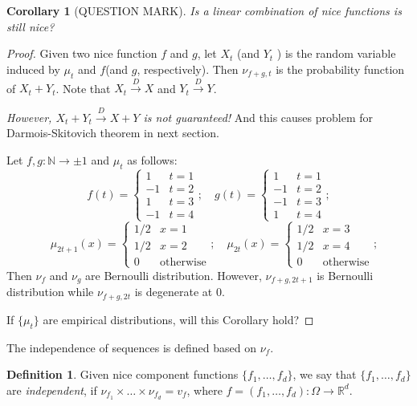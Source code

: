 \documentclass[english]{article} %
\newcommand{\real}{\mathbb{R}}
\renewcommand{\natural}{\mathbb{N}}
\providecommand{\definitionname}{Definition}
\providecommand{\corollaryname}{Corollary}
\theoremstyle{plain}
\newtheorem{cor}[thm]{\protect\corollaryname}
\theoremstyle{definition}
\newtheorem{definition}{\protect\definitionname}
\theoremstyle{remark}
\begin{document}
\begin{cor}[QUESTION MARK]
Is a linear combination of nice functions is still nice?
\end{cor}
\begin{proof}
Given two nice function $f$ and $g$, let $X_t$ (and $Y_t$ ) is the random variable induced by $\mu_t$ and $f$(and $g$, respectively). Then $\nu_{f+g,t}$ is the probability function of $X_t+Y_t$. Note that $X_t \xrightarrow{D} X$ and  $Y_t \xrightarrow{D} Y$. 

\emph{However, $X_t+Y_t \xrightarrow{D} X+Y$ is not guaranteed!} And this causes problem for Darmois-Skitovich theorem in next section.

Let $f,g:\natural \rightarrow {\pm1}$ and $\mu_t$ as follows:
\[
f(t) = \begin{cases} 1 & t=1 \\
					-1 & t=2 \\
					1  & t=3 \\
					-1 & t=4 
					\end{cases};
\quad g(t) = \begin{cases} 1 & t=1 \\
					-1 & t=2 \\
					-1  & t=3 \\
					1 & t=4 
					\end{cases};
\]
\[
\quad \mu_{2t+1}(x) = \begin{cases} 1/2 & x=1 \\
					1/2 & x=2 \\
					0  & \text{otherwise} 
					\end{cases};	
\quad \mu_{2t}(x) = \begin{cases} 1/2 & x=3 \\
					1/2 & x=4 \\
					0  & \text{otherwise} 
					\end{cases};		
\]
Then $\nu_f$ and $\nu_g$ are Bernoulli distribution. However, $\nu_{f+g,2t+1}$ is Bernoulli distribution while $\nu_{f+g,2t}$ is degenerate at 0. 

If $\{\mu_t\}$ are empirical distributions, will this Corollary hold?
\end{proof}
The independence of sequences is defined based on $\nu_f$.
\begin{definition}
Given nice component functions $\{f_1,\ldots,f_d\}$, we say that $\{f_1,\ldots,f_d\}$ are \emph{independent}, if $\nu_{f_1}\times\ldots\times\nu_{f_d} = v_f$, where $f = (f_1,\ldots,f_d):\Omega \rightarrow \real^d$.
\end{definition}
\end{document}
